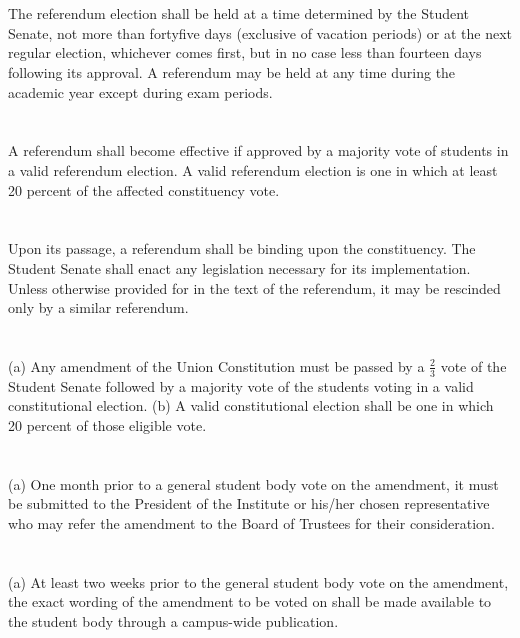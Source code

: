 \documentclass[12pt]{constitution}
\begin{document}
\section{}
The referendum election shall be held at a time determined by the Student Senate, not more than fortyfive
days (exclusive of vacation periods) or at the next regular election, whichever comes first, but in no
case less than fourteen days following its approval. A referendum may be held at any time during the
academic year except during exam periods.

\section{}
A referendum shall become effective if approved by a majority vote of students in a valid referendum
election. A valid referendum election is one in which at least 20 percent of the affected constituency
vote.

\section{}
Upon its passage, a referendum shall be binding upon the constituency. The Student Senate shall enact
any legislation necessary for its implementation. Unless otherwise provided for in the text of the
referendum, it may be rescinded only by a similar referendum. 


\section{}
(a) Any amendment of the Union Constitution must be passed by a $\frac{2}{3}$ vote of the Student Senate
followed by a majority vote of the students voting in a valid constitutional election.
(b) A valid constitutional election shall be one in which 20 percent of those eligible vote.

\section{}
(a) One month prior to a general student body vote on the amendment, it must be submitted to the
President of the Institute or his/her chosen representative who may refer the amendment to 
the Board of Trustees for their consideration.

\section{}
(a) At least two weeks prior to the general student body vote on the amendment, the exact
wording of the amendment to be voted on shall be made available to the student body through
a campus-wide publication.
\end{document}
